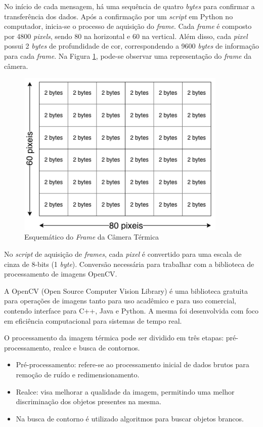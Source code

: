 	    No início de cada mensagem, há uma sequência de quatro \textit{bytes} para confirmar a transferência dos dados. Após a confirmação por um \textit{script} em Python no computador, inicia-se o processo de aquisição do \textit{frame}. Cada \textit{frame} é composto por 4800 \textit{pixels}, sendo 80 na horizontal e 60 na vertical. Além disso, cada \textit{pixel} possui 2 \textit{bytes} de profundidade de cor, correspondendo a 9600 \textit{bytes} de informação para cada \textit{frame}. Na Figura \ref{fig:frame_esque}, pode-se observar uma representação do \textit{frame} da câmera.
	    
	
		\begin{figure}[!ht]
		   \centering
		   \includegraphics[width=10cm]{Figures/frame_esque.png}
		   \caption{Esquemático do \textit{Frame} da Câmera Térmica}
		   \label{fig:frame_esque}
		\end{figure}
		
		No \textit{script} de aquisição de \textit{frames}, cada \textit{pixel} é convertido para uma escala de cinza de 8-bits (1 \textit{byte}). Conversão necessária para trabalhar com a biblioteca de processamento de imagens OpenCV.
		    
		A OpenCV (Open Source Computer Vision Library) é uma biblioteca gratuita para operações de imagens tanto para uso acadêmico e para uso comercial, contendo interface para C++, Java e Python. A mesma foi desenvolvida com foco em eficiência computacional para sistemas de tempo real.

		O processamento da imagem térmica pode ser dividido em três etapas:  pré-processamento, realce e busca de contornos.
		
		\begin{itemize}
			\item Pré-processamento: refere-se ao processamento inicial de dados brutos para remoção de ruído e redimensionamento.
			\item Realce: visa melhorar a qualidade da imagem, permitindo uma melhor discriminação dos objetos presentes na mesma.
			\item Na busca de contorno é utilizado algoritmos para buscar objetos brancos.
		\end{itemize}
		
